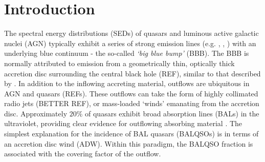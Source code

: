 \documentclass[useAMS,usenatbib]{mn2e_x}
\begin{document}



%
%

\section{Introduction}


The spectral energy distributions (SEDs) of 
quasars and luminous active galactic nuclei (AGN) 
typically exhibit a series of strong emission lines (e.g. \la, \civ, \nv) 
with an underlying blue continuum - the so-called {\sl `big blue bump'} (BBB). 
The BBB is normally attributed to emission from a geometrically thin, 
optically thick accretion disc surrounding the central black hole (REF), similar
to that described by \cite{shakurasunyaev1973}.
In addition to the inflowing accreting material, 
outflows are ubiquitous in AGN
and quasars (REFs). These outflows can take the form of 
highly collimated radio jets \citep{bellonijet2010}(BETTER REF), 
or mass-loaded `winds' emanating from the accretion disc. 
Approximately $20\%$ of quasars exhibit broad absorption lines (BALs) in the ultraviolet,
providing clear evidence for outflowing absorbing material
\citep{weymann1991, reichard2003, knigge2008, turnermiller2009, allen2011}.
The simplest explanation for the incidence of 
BAL quasars (BALQSOs) is in terms of an accretion disc wind (ADW). 
Within this paradigm, the BALQSO fraction is associated with
the covering factor of the outflow.
\end{document}
